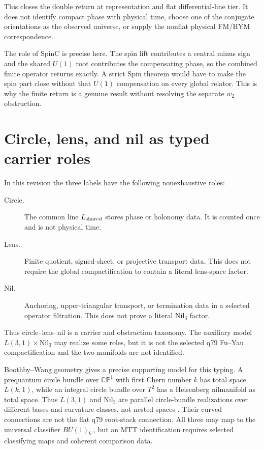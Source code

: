 \documentclass[11pt]{article}
\begin{document}
This closes the double return at representation and flat differential-line
tier. It does not identify compact phase with physical time, choose one of the
conjugate orientations as the observed universe, or supply the nonflat
physical FM/HYM correspondence.

The role of SpinC is precise here.  The spin lift contributes a central minus
sign and the shared $U(1)$ root contributes the compensating phase, so the
combined finite operator returns exactly.  A strict Spin theorem would have to
make the spin part close without that $U(1)$ compensation on every global
relator.  This is why the finite return is a genuine result without resolving
the separate $w_2$ obstruction.

\section{Circle, lens, and nil as typed carrier roles}

In this revision the three labels have the following nonexhaustive roles:
\begin{description}
\item[Circle.] The common line $L_{\rm shared}$ stores phase or holonomy data.
It is counted once and is not physical time.
\item[Lens.] Finite quotient, signed-sheet, or projective transport data.  This
does not require the global compactification to contain a literal lens-space
factor.
\item[Nil.] Anchoring, upper-triangular transport, or termination data in a
selected operator filtration.  This does not prove a literal Nil$_3$ factor.
\end{description}

Thus circle--lens--nil is a carrier and obstruction taxonomy.  The auxiliary
model $L(3,1)\times\mathrm{Nil}_3$ may realize some roles, but it is not the
selected q79 Fu--Yau compactification and the two manifolds are not identified.

Boothby--Wang geometry gives a precise supporting model for this typing. A
prequantum circle bundle over $\mathbb{CP}^1$ with first Chern number $k$ has
total space $L(k,1)$, while an integral circle bundle over $T^2$ has a
Heisenberg nilmanifold as total space. Thus $L(3,1)$ and Nil$_3$ are parallel
circle-bundle realizations over different bases and curvature classes, not
nested spaces \cite{BoothbyWang,ContactBlowup}. Their curved connections are
not the flat q79 root-stack connection. All three may map to the universal
classifier $BU(1)_\nabla$, but an MTT identification requires selected
classifying maps and coherent comparison data.
\end{document}
